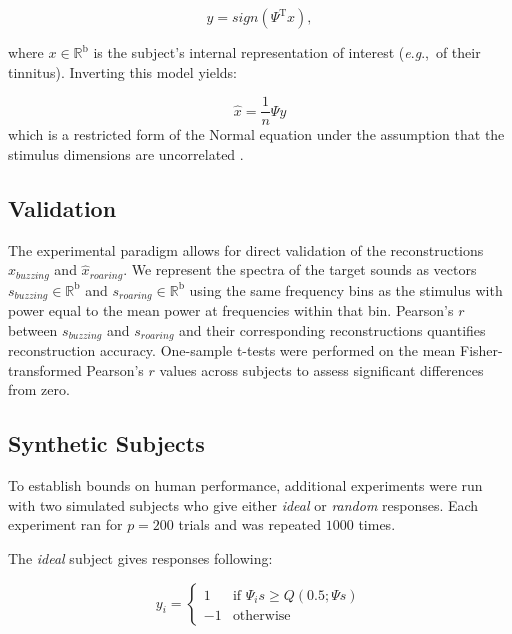 \documentclass[journal]{IEEEtran}
\newcommand{\eg}{\textit{e}.\textit{g}.,\ }
\begin{document}
\begin{equation}
  y = sign(\Psi^\mathrm{T} x),
  \label{eq:subjresp} 
\end{equation}

where $x \in \mathbb{R}^\mathrm{b}$ is the subject's internal representation of interest (\eg of their tinnitus).
Inverting this model yields:

\begin{equation}
  \hat{x} = \frac{1}{n} \Psi y
  \label{eq:linreg}
\end{equation}
which is a restricted form of the Normal equation under
the assumption that the stimulus dimensions are uncorrelated \cite{gosselinSuperstitiousPerceptionsReveal2003}.

\subsection{Validation}

The experimental paradigm allows for direct validation of the reconstructions $\hat{x}_{buzzing}$ and $\hat{x}_{roaring}$.
We represent the spectra of the target sounds as vectors $s_{buzzing} \in \mathbb{R}^\mathrm{b}$ and $s_{roaring} \in \mathbb{R}^\mathrm{b}$ using the same frequency bins as the stimulus with power equal to the mean power at frequencies within that bin.
Pearson's $r$ between $s_{buzzing}$ and $s_{roaring}$ and their corresponding reconstructions quantifies reconstruction accuracy.
One-sample t-tests were performed on the mean Fisher-transformed Pearson's $r$ values across subjects to assess significant differences from zero.

\subsection{Synthetic Subjects}

To establish bounds on human performance,
additional experiments were run with two simulated subjects who give either \textit{ideal} or \textit{random} responses.
Each experiment ran for $p=200$ trials and was repeated $1000$ times.

The \textit{ideal} subject gives responses following:

\begin{equation}
    y_i =
        \begin{cases}
            1 & \text{if } \Psi_i s \geq Q(0.5; \Psi s) \\
            -1 & \text{otherwise}
        \end{cases}
\end{equation}
\end{document}
